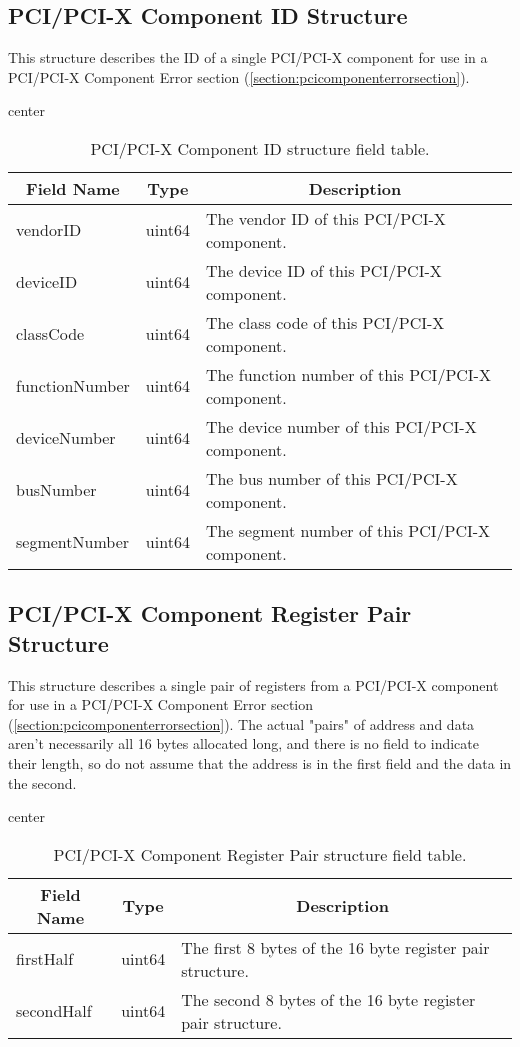\documentclass{report}
\newcommand*{\thead}[1]{\multicolumn{1}{|c|}{\bfseries #1}}
\newcommand*{\jsontable}[1]{
    \begin{table}[!ht]
    \label{#1}
    \centering
    \begin{adjustbox}{center}
    \begin{tabular}{|l|c|p{8cm}|}
    \hline
    \thead{Field Name} & \thead{Type} & \thead{Description} \\
    \hline
}
\newcommand*{\jsontableend}[1]{
    \hline
    \end{tabular}
    \end{adjustbox}
    \caption{#1}
    \label{table:#1}
    \end{table}
    \FloatBarrier
}
\begin{document}
\subsection{PCI/PCI-X Component ID Structure}
\label{subsection:pcicomponentidstructure}
This structure describes the ID of a single PCI/PCI-X component for use in a PCI/PCI-X Component Error section (\ref{section:pcicomponenterrorsection}).
\jsontable{table:pcicomponentidstructure}
vendorID & uint64 & The vendor ID of this PCI/PCI-X component.\\
\hline
deviceID & uint64 & The device ID of this PCI/PCI-X component.\\
\hline
classCode & uint64 & The class code of this PCI/PCI-X component.\\
\hline
functionNumber & uint64 & The function number of this PCI/PCI-X component.\\
\hline
deviceNumber & uint64 & The device number of this PCI/PCI-X component.\\
\hline
busNumber & uint64 & The bus number of this PCI/PCI-X component.\\
\hline
segmentNumber & uint64 & The segment number of this PCI/PCI-X component.\\
\jsontableend{PCI/PCI-X Component ID structure field table.}

\subsection{PCI/PCI-X Component Register Pair Structure}
\label{subsection:pcicomponentregisterpairstructure}
This structure describes a single pair of registers from a PCI/PCI-X component for use in a PCI/PCI-X Component Error section (\ref{section:pcicomponenterrorsection}). The actual "pairs" of address and data aren't necessarily all 16 bytes allocated long, and there is no field to indicate their length, so do not assume that the address is in the first field and the data in the second.
\jsontable{table:pcicomponentregisterpairstructure}
firstHalf & uint64 & The first 8 bytes of the 16 byte register pair structure.\\
\hline
secondHalf & uint64 & The second 8 bytes of the 16 byte register pair structure.\\
\jsontableend{PCI/PCI-X Component Register Pair structure field table.}

\end{document}
